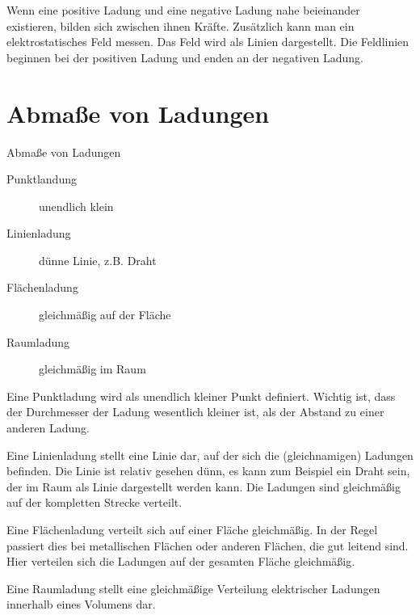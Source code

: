 \documentclass[aspectratio=169, ignorenonframetext]{beamer}
\begin{document}
Wenn eine positive Ladung und eine negative Ladung nahe beieinander existieren, bilden sich zwischen ihnen Kräfte. Zusätzlich kann man ein elektrostatisches Feld messen. Das Feld wird als Linien dargestellt. Die Feldlinien beginnen bei der positiven Ladung und enden an der negativen Ladung.

\section[Ladungen]{Abmaße von Ladungen}

\begin{frame}{Abmaße von Ladungen}
  \begin{description}
    \item[Punktlandung] unendlich klein
    \item[Linienladung] dünne Linie, z.B. Draht
    \item[Flächenladung] gleichmäßig auf der Fläche
    \item[Raumladung] gleichmäßig im Raum
  \end{description}
\end{frame}
Eine Punktladung wird als unendlich kleiner Punkt definiert. Wichtig ist, dass der Durchmesser der Ladung wesentlich kleiner ist, als der Abstand zu einer anderen Ladung.

Eine Linienladung stellt eine Linie dar, auf der sich die (gleichnamigen) Ladungen befinden. Die Linie ist relativ gesehen dünn, es kann zum Beispiel ein Draht sein, der im Raum als Linie dargestellt werden kann. Die Ladungen sind gleichmäßig auf der kompletten Strecke verteilt.

Eine Flächenladung verteilt sich auf einer Fläche gleichmäßig. In der Regel passiert dies bei metallischen Flächen oder anderen Flächen, die gut leitend sind. Hier verteilen sich die Ladungen auf der gesamten Fläche gleichmäßig.

Eine Raumladung stellt eine gleichmäßige Verteilung elektrischer Ladungen innerhalb eines Volumens dar.
\end{document}
